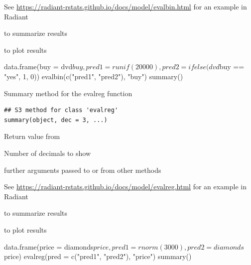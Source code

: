 \documentclass[a4paper]{book}
\begin{document}
%
\begin{Details}
See \url{https://radiant-rstats.github.io/docs/model/evalbin.html} for an example in Radiant
\end{Details}
%
\begin{SeeAlso}
 to summarize results

 to plot results
\end{SeeAlso}
%
\begin{Examples}
\begin{ExampleCode}
data.frame(buy = dvd$buy, pred1 = runif(20000), pred2 = ifelse(dvd$buy == "yes", 1, 0)) %
  evalbin(c("pred1", "pred2"), "buy") %
  summary()
\end{ExampleCode}
\end{Examples}
%
\begin{Description}
Summary method for the evalreg function
\end{Description}
%
\begin{Usage}
\begin{verbatim}
## S3 method for class 'evalreg'
summary(object, dec = 3, ...)
\end{verbatim}
\end{Usage}
%
\begin{Arguments}
\begin{ldescription}
\item[\code{object}] Return value from 

\item[\code{dec}] Number of decimals to show

\item[\code{...}] further arguments passed to or from other methods
\end{ldescription}
\end{Arguments}
%
\begin{Details}
See \url{https://radiant-rstats.github.io/docs/model/evalreg.html} for an example in Radiant
\end{Details}
%
\begin{SeeAlso}
 to summarize results

 to plot results
\end{SeeAlso}
%
\begin{Examples}
\begin{ExampleCode}
data.frame(price = diamonds$price, pred1 = rnorm(3000), pred2 = diamonds$price) %
  evalreg(pred = c("pred1", "pred2"), "price") %
  summary()

\end{ExampleCode}
\end{Examples}
\end{document}
